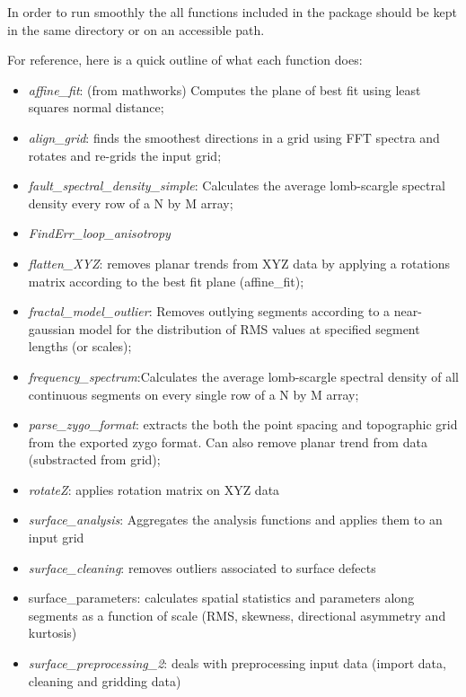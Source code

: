 \documentclass[12pt,a4paper]{article}
\begin{document}
In order to run smoothly the all functions included in the package should be kept in the same directory or on an accessible path. 

For reference, here is a quick outline of what each function does:

\begin{itemize}
	\item[] \textit{affine\_fit}: (from mathworks) Computes the plane of best fit using least squares normal distance;
	\item[] \textit{align\_grid}: finds the smoothest directions in a grid using FFT spectra and rotates and re-grids the input grid;
	\item[] \textit{fault\_spectral\_density\_simple}: Calculates the average lomb-scargle spectral density every row of a N by M array;
	\item[] \textit{FindErr\_loop\_anisotropy}
	\item[] \textit{flatten\_XYZ}: removes planar trends from XYZ data by applying a rotations matrix according to the best fit plane (affine\_fit);
	\item[] \textit{fractal\_model\_outlier}: Removes outlying segments according to a near-gaussian model for the distribution of RMS values at specified segment lengths (or scales);
	\item[] \textit{frequency\_spectrum}:Calculates the average lomb-scargle spectral density of all continuous 	segments on every single row of a N by M array;
	\item[] \textit{parse\_zygo\_format}: extracts the both the point spacing and topographic grid from the exported zygo format. Can also remove planar trend from data (substracted from grid);
	\item[] \textit{rotateZ}: applies rotation matrix on XYZ data
	\item[] \textit{surface\_analysis}: Aggregates the analysis functions and applies them to an input grid
	\item[] \textit{surface\_cleaning}: removes outliers associated to surface defects
	\item[] surface\_parameters: calculates spatial statistics and parameters along segments as a function of scale (RMS, skewness, directional asymmetry and kurtosis)
	\item[] \textit{surface\_preprocessing\_2}: deals with preprocessing input data (import data, cleaning and gridding data)

\end{itemize}
\end{document}
